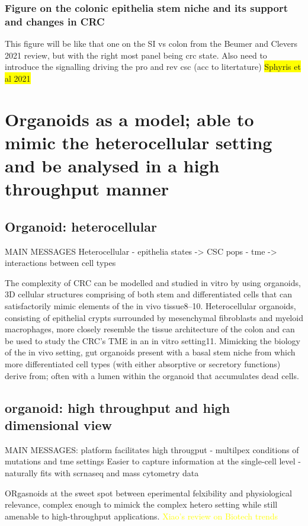 \subsubsection{Figure on the colonic epithelia stem niche and its support and changes in CRC}
This figure will be like that one on the SI vs colon from the Beumer and Clevers 2021 review, but with the right most panel being crc state. Also need to introduce the signalling driving the pro and rev csc (acc to litertature) \colorbox{yellow}{Sphyris et al 2021}

\section{Organoids as a model; able to mimic the heterocellular setting and be analysed in a high throughput manner}

\subsection{Organoid: heterocellular}

MAIN MESSAGES
Heterocellular
    - epithelia states -> CSC pops
    - tme -> interactions between cell types

The complexity of CRC can be modelled and studied in vitro by using organoids, 3D cellular structures comprising of both stem and differentiated cells that can satisfactorily mimic elements of the in vivo tissue8–10. Heterocellular organoids, consisting of epithelial crypts surrounded by mesenchymal fibroblasts and myeloid macrophages, more closely resemble the tissue architecture of the colon and can be used to study the CRC’s TME in an in vitro setting11. Mimicking the biology of the in vivo setting, gut organoids present with a basal stem niche from which more differentiated cell types (with either absorptive or secretory functions) derive from; often with a lumen within the organoid that accumulates dead cells.

\subsection{organoid: high throughput and high dimensional view}

MAIN MESSAGES:
platform facilitates high througput
    - multilpex conditions of mutations and tme settings
Easier to capture information at the single-cell level
    - naturally fits with scrnaseq and mass cytometry data

ORgasnoids at the sweet spot between eperimental felxibility and physiological relevance, complex enough to mimick the complex hetero setting while still amenable to high-throughput applications. \textcolor{yellow}{Xiao's review on Biotech trends}


